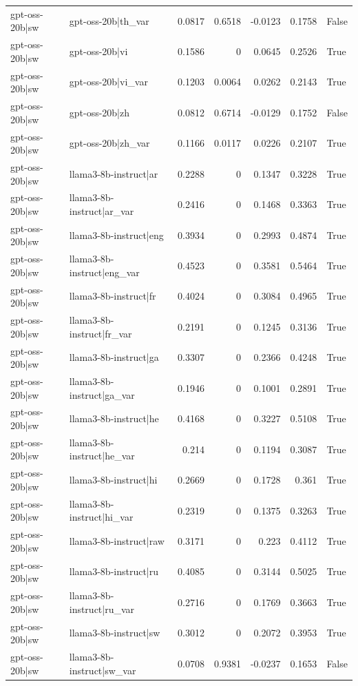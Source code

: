 \begin{table}
\begin{tabular}{l l r r r r l}
gpt-oss-20b|sw & gpt-oss-20b|th_var & 0.0817 & 0.6518 & -0.0123 & 0.1758 & False \\
gpt-oss-20b|sw & gpt-oss-20b|vi & 0.1586 & 0 & 0.0645 & 0.2526 & True \\
gpt-oss-20b|sw & gpt-oss-20b|vi_var & 0.1203 & 0.0064 & 0.0262 & 0.2143 & True \\
gpt-oss-20b|sw & gpt-oss-20b|zh & 0.0812 & 0.6714 & -0.0129 & 0.1752 & False \\
gpt-oss-20b|sw & gpt-oss-20b|zh_var & 0.1166 & 0.0117 & 0.0226 & 0.2107 & True \\
gpt-oss-20b|sw & llama3-8b-instruct|ar & 0.2288 & 0 & 0.1347 & 0.3228 & True \\
gpt-oss-20b|sw & llama3-8b-instruct|ar_var & 0.2416 & 0 & 0.1468 & 0.3363 & True \\
gpt-oss-20b|sw & llama3-8b-instruct|eng & 0.3934 & 0 & 0.2993 & 0.4874 & True \\
gpt-oss-20b|sw & llama3-8b-instruct|eng_var & 0.4523 & 0 & 0.3581 & 0.5464 & True \\
gpt-oss-20b|sw & llama3-8b-instruct|fr & 0.4024 & 0 & 0.3084 & 0.4965 & True \\
gpt-oss-20b|sw & llama3-8b-instruct|fr_var & 0.2191 & 0 & 0.1245 & 0.3136 & True \\
gpt-oss-20b|sw & llama3-8b-instruct|ga & 0.3307 & 0 & 0.2366 & 0.4248 & True \\
gpt-oss-20b|sw & llama3-8b-instruct|ga_var & 0.1946 & 0 & 0.1001 & 0.2891 & True \\
gpt-oss-20b|sw & llama3-8b-instruct|he & 0.4168 & 0 & 0.3227 & 0.5108 & True \\
gpt-oss-20b|sw & llama3-8b-instruct|he_var & 0.214 & 0 & 0.1194 & 0.3087 & True \\
gpt-oss-20b|sw & llama3-8b-instruct|hi & 0.2669 & 0 & 0.1728 & 0.361 & True \\
gpt-oss-20b|sw & llama3-8b-instruct|hi_var & 0.2319 & 0 & 0.1375 & 0.3263 & True \\
gpt-oss-20b|sw & llama3-8b-instruct|raw & 0.3171 & 0 & 0.223 & 0.4112 & True \\
gpt-oss-20b|sw & llama3-8b-instruct|ru & 0.4085 & 0 & 0.3144 & 0.5025 & True \\
gpt-oss-20b|sw & llama3-8b-instruct|ru_var & 0.2716 & 0 & 0.1769 & 0.3663 & True \\
gpt-oss-20b|sw & llama3-8b-instruct|sw & 0.3012 & 0 & 0.2072 & 0.3953 & True \\
gpt-oss-20b|sw & llama3-8b-instruct|sw_var & 0.0708 & 0.9381 & -0.0237 & 0.1653 & False \\

\end{tabular}
\end{table}
